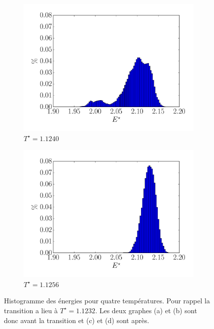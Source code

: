 \documentclass[11pt]{article}
\numberwithin{equation}{section}
\begin{document}
\begin{figure}
    \begin{subfigure}[b]{0.49\textwidth}
    	\center
    	\includegraphics[scale=0.4]{figures/histo_11240.pdf}
    	\caption{$T^\star =1.1240$}
    	\label{11240}
    \end{subfigure}	
    \begin{subfigure}[b]{0.49\textwidth}
    	\center
    	\includegraphics[scale=0.4]{figures/histo_11256.pdf}
    	\caption{$T^\star =1.1256$}
    	\label{11256}
    \end{subfigure}	
    \caption{Histogramme des énergies pour quatre températures. Pour rappel la transition a lieu à $T^\star = 1.1232$. Les deux graphes (a) et (b) sont donc avant la transition et (c) et (d) sont après.}
    \label{histoo}
\end{figure}
\end{document}
